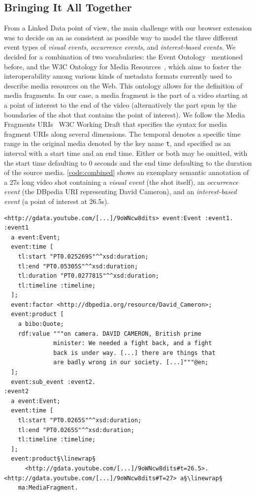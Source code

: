 \documentclass[runningheads,a4paper]{llncs}
\newcommand{\linewrap}{\raisebox{-.6ex}{\textcolor{grey}{$\hookleftarrow$}}}
\begin{document}
\subsection{Bringing It All Together}
From a Linked Data point of view, the main challenge with our browser extension was to decide on an as consistent as possible way to model the three different event types of \emph{visual events}, \emph{occurrence events}, and \emph{interest-based events}. We decided for a combination of two vocabularies: the Event Ontology~\cite{Raimond:Event} mentioned before, and the W3C Ontology for Media Resources~\cite{mediaontology}, which aims to foster the interoperability among various kinds of metadata formats currently used to describe media resources on the Web. This ontology allows for the definition of media fragments. In our case, a media fragment is the part of a video starting at a point of interest to the end of the video (alternatively the part spun by the boundaries of the shot that contains the point of interest). We follow the Media Fragments URIs~\cite{W3C:MediaFrags} W3C Working Draft that specifies the syntax for media fragment URIs along several dimensions. The temporal denotes a specific time range in the original media denoted by the key name \texttt{t}, and specified as an interval with a start time and an end time. Either or both may be omitted, with the start time defaulting to 0 seconds and the end time defaulting to the duration of the source media. \autoref{code:combined} shows an exemplary semantic annotation of a 27s long video shot containing a \emph{visual event} (the shot itself), an \emph{occurrence event} (the DBpedia URI representing David Cameron), and an \emph{interest-based event} (a point of interest at 26.5s). 

\begin{lstlisting}[caption=Semantic annotation of a 27s long video shot showing David Cameron talk about the London riots (\texttt{:event1}). A point of interest generated by a YouTube user (\texttt{:event2} that is modeled as a sub event of \texttt{:event1}) is defined at 26.5s in the video where Cameron starts to appear., label=code:combined, float=htb!, escapechar=§]
<http://gdata.youtube.com/[...]/9oWNcw8dits> event:Event :event1.
:event1
  a event:Event;
  event:time [
    tl:start "PT0.025269S"^^xsd:duration;
    tl:end "PT0.05305S"^^xsd:duration;
    tl:duration "PT0.027781S"^^xsd:duration;
    tl:timeline :timeline;
  ];
  event:factor <http://dbpedia.org/resource/David_Cameron>;
  event:product [
    a bibo:Quote;
    rdf:value """on camera. DAVID CAMERON, British prime
              minister: We needed a fight back, and a fight
              back is under way. [...] there are things that
              are badly wrong in our society. [...]"""@en;
  ];
  event:sub_event :event2.
:event2
  a event:Event;
  event:time [
    tl:start "PT0.0265S"^^xsd:duration;
    tl:end "PT0.0265S"^^xsd:duration;
    tl:timeline :timeline;
  ];  
  event:product§\linewrap§
      <http://gdata.youtube.com/[...]/9oWNcw8dits#t=26.5>.
<http://gdata.youtube.com/[...]/9oWNcw8dits#T=27> a§\linewrap§
    ma:MediaFragment.
\end{lstlisting} 
\end{document}
